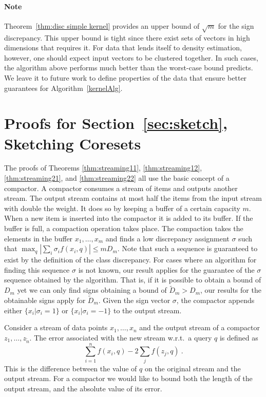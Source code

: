 \documentclass[12pt]{colt2019} %
\begin{document}
\paragraph{Note} Theorem~\ref{thm:disc simple kernel} provides an upper bound of $\sqrt{m}$ for the sign discrepancy. 
This upper bound is tight since there exist sets of vectors in high dimensions that requires it. 
For data that lends itself to density estimation, however, one should expect input vectors to be clustered together.
In such cases, the algorithm above performs much better than the worst-case bound predicts. 
We leave it to future work to define properties of the data that ensure better guarantees for Algorithm~\ref{kernelAlg}.


\appendix

\section{Proofs for Section~\ref{sec:sketch}, Sketching Coresets} \label{app:sketch proof}


The proofs of Theorems \ref{thm:streaming11}, \ref{thm:streaming12}, \ref{thm:streaming21}, and \ref{thm:streaming22} all use the basic concept of a compactor. A compactor consumes a stream of items and outputs another stream. 
The output stream contains at most half the items from the input stream with double the weight. 
It does so by keeping a buffer of a certain capacity $m$. When a new item is inserted into the compactor it is added to its buffer. 
If the buffer is full, a compaction operation takes place. 
The compaction takes the elements in the buffer $x_1,\ldots,x_m$ and finds a low discrepancy assignment $\sigma$ such that 
$\max_q |\sum_i \sigma_i f(x_i,q)| \leq m D_m$. 
Note that such a sequence is guaranteed to exist by the definition of the class discrepancy. For cases where an algorithm for finding this sequence $\sigma$ is not known, our result applies for the guarantee of the $\sigma$ sequence obtained by the algorithm. 
That is, if it is possible to obtain a bound of $D_m$ yet we can only find signs obtaining a bound of $\tilde{D}_m > D_m$, our results for the obtainable signs apply for $\tilde{D}_m$.
Given the sign vector $\sigma$, the compactor appends either $\{ x_i | \sigma_i = 1\}$ or  $\{ x_i | \sigma_i = -1\}$ to the output stream. 

Consider a stream of data points $x_1,\ldots,x_n$ and the output stream of a compactor $z_1,\ldots,z_{\tilde{n}}$. The error associated with the new stream w.r.t.\ a query $q$ is defined as
$$ \sum_{i=1}^n f(x_i,q) - 2\sum_j f(z_j,q) \ .$$
This is the difference between the value of $q$ on the original stream and the output stream. For a compactor we would like to bound both the length of the output stream, and the absolute value of its error.
\end{document}
